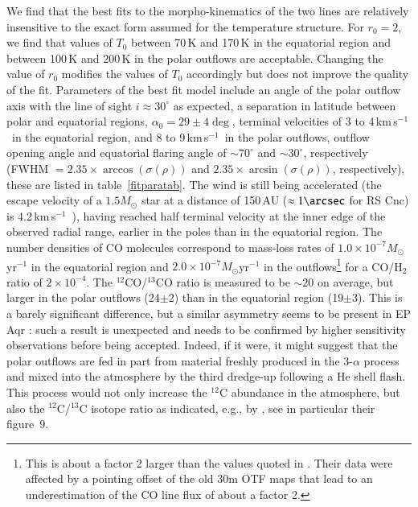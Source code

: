 \documentclass{aa}
\newcommand{\kms}{\,km\,s$^{-1}$~}
\begin{document}
We find that the best fits to the morpho-kinematics of the two lines
are relatively insensitive to the exact form assumed for the
temperature structure. For $r_0=2$\arcsec, we find that values of
$T_0$ between 70\,K and 170\,K in the equatorial region and between
100\,K and 200\,K in the polar outflows are acceptable. Changing the
value of $r_0$ modifies the values of $T_0$ accordingly but does not
improve the quality of the fit. Parameters of the best fit model
include an angle of the polar outflow axis with the line of sight $i
\approx 30^{\circ}$ as expected, a separation in latitude between
polar and equatorial regions, $\alpha_0 = 29\pm4\deg$, terminal
velocities of 3 to 4\kms in the equatorial region, and 8 to 9\kms in
the polar outflows, outflow opening angle and equatorial flaring angle
of $\sim 70^{\circ}$ and $\sim 30^{\circ}$, respectively (FWHM
$=2.35\times\arccos\left(\sigma(\rho)\right)$ and
$2.35\times\arcsin\left(\sigma(\rho)\right)$, respectively), these are
listed in table~\ref{fitparatab}.  The wind is still being accelerated
(the escape velocity of a $1.5M_{\odot}$ star at a distance of 150\,AU
($\approx 1\arcsec$ for RS Cnc) is 4.2\kms), having reached half
terminal velocity at the inner edge of the observed radial range,
earlier in the poles than in the equatorial region. The number
densities of CO molecules correspond to mass-loss rates of $1.0 \times
10^{-7}M_{\odot}$yr$^{-1}$ in the equatorial region and $2.0 \times
10^{-7}M_{\odot}$yr$^{-1}$ in the outflows\footnote{This is about a
factor 2 larger than the values quoted in \citet{hmwng14}. Their data
were affected by a pointing offset of the old 30m OTF maps that lead
to an underestimation of the CO line flux of about a factor 2.} for a
CO/H$_2$ ratio of $2 \times 10^{-4}$.  The $^{12}$CO/$^{13}$CO ratio
is measured to be $\sim 20$ on average, but larger in the polar
outflows (24$\pm$2) than in the equatorial region (19$\pm$3). This is
a barely significant difference, but a similar asymmetry seems to be
present in EP Aqr \citep{thnetal2019}: such a result is unexpected and
needs to be confirmed by higher sensitivity observations before being
accepted. Indeed, if it were, it might suggest that the polar outflows
are fed in part from material freshly produced in the 3-$\alpha$
process and mixed into the atmosphere by the third dredge-up following
a He shell flash.  This process would not only increase the $^{12}$C
abundance in the atmosphere, but also the $^{12}$C/$^{13}$C isotope
ratio as indicated, e.g., by \citet{1990ApJS...72..387S}, see in
particular their figure~9.
\end{document}
